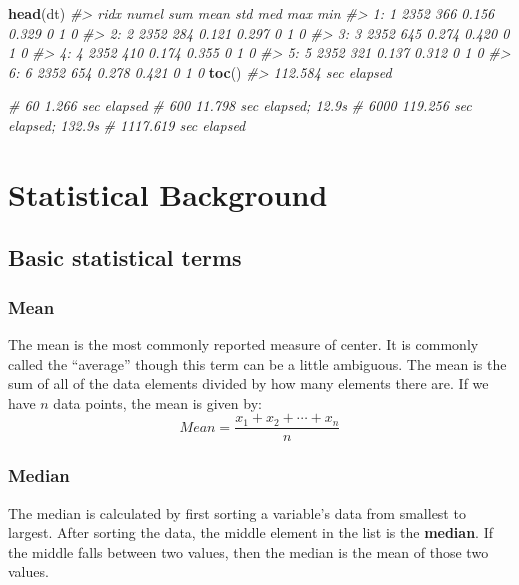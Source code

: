 \documentclass[]{book}
\newenvironment{Shaded}{\begin{snugshade}}{\end{snugshade}}
\newcommand{\CommentTok}[1]{\textcolor[rgb]{0.56,0.35,0.01}{\textit{#1}}}
\newcommand{\KeywordTok}[1]{\textcolor[rgb]{0.13,0.29,0.53}{\textbf{#1}}}
\newcommand{\NormalTok}[1]{#1}
\begin{document}
\begin{Shaded}
\begin{Highlighting}[]
\KeywordTok{head}\NormalTok{(dt)}
\CommentTok{#>    ridx numel sum  mean   std med max min}
\CommentTok{#> 1:    1  2352 366 0.156 0.329   0   1   0}
\CommentTok{#> 2:    2  2352 284 0.121 0.297   0   1   0}
\CommentTok{#> 3:    3  2352 645 0.274 0.420   0   1   0}
\CommentTok{#> 4:    4  2352 410 0.174 0.355   0   1   0}
\CommentTok{#> 5:    5  2352 321 0.137 0.312   0   1   0}
\CommentTok{#> 6:    6  2352 654 0.278 0.421   0   1   0}
\KeywordTok{toc}\NormalTok{()}
\CommentTok{#> 112.584 sec elapsed}

\CommentTok{#   60   1.266 sec elapsed}
\CommentTok{#  600   11.798 sec elapsed; 12.9s}
\CommentTok{# 6000  119.256 sec elapsed; 132.9s}
\CommentTok{# 1117.619 sec elapsed}
\end{Highlighting}
\end{Shaded}

\cleardoublepage

\hypertarget{appendix-appendix}{%
\appendix}


\hypertarget{appendixA}{%
\chapter{Statistical Background}\label{appendixA}}

\hypertarget{basic-statistical-terms}{%
\section{Basic statistical terms}\label{basic-statistical-terms}}

\hypertarget{mean}{%
\subsection{Mean}\label{mean}}

The mean is the most commonly reported measure of center. It is commonly called the ``average'' though this term can be a little ambiguous. The mean is the sum of all of the data elements divided by how many elements there are. If we have \(n\) data points, the mean is given by: \[Mean = \frac{x_1 + x_2 + \cdots + x_n}{n}\]

\hypertarget{median}{%
\subsection{Median}\label{median}}

The median is calculated by first sorting a variable's data from smallest to largest. After sorting the data, the middle element in the list is the \textbf{median}. If the middle falls between two values, then the median is the mean of those two values.
\end{document}
